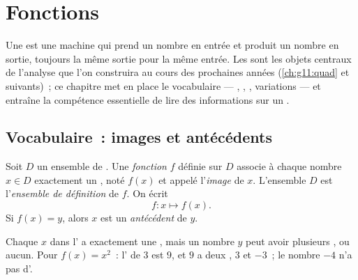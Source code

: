 \chapter{Fonctions}\label{ch:g10:functions}

Une  est une machine qui prend un nombre en entrée et produit un
nombre en sortie, toujours la même sortie pour la même entrée. Les
 sont les objets centraux de l'analyse que l'on construira au
cours des prochaines années (\cref{ch:g11:quad} et suivants)~; ce chapitre
met en place le vocabulaire --- , , ,
variations --- et entraîne la compétence essentielle de lire des
informations sur un .

\section{Vocabulaire~: images et antécédents}

\begin{definition}[Fonction]\label{def:g10:functions:function}
Soit $D$ un ensemble de . Une \emph{fonction}
$f$ définie sur $D$ associe à chaque nombre $x \in D$ exactement un
, noté $f(x)$ et appelé l'\emph{image} de $x$.
L'ensemble $D$ est l'\emph{ensemble de définition} de $f$. On écrit
\[
f : x \longmapsto f(x).
\]
Si $f(x) = y$, alors $x$ est un \emph{antécédent} de
$y$.
\end{definition}

\begin{remark}
Chaque $x$ dans l' a exactement une , mais un
nombre $y$ peut avoir plusieurs , ou aucun. Pour
$f(x) = x^2$~: l' de $3$ est $9$, et $9$ a deux , $3$ et
$-3$~; le nombre $-4$ n'a pas d'.
\end{remark}

